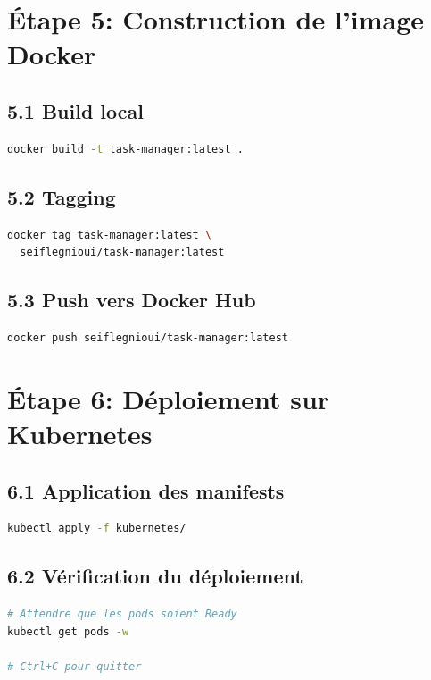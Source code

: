 \documentclass[12pt,a4paper,twoside]{report}
\begin{document}
\section{Étape 5: Construction de l'image Docker}

\subsection{5.1 Build local}

\begin{lstlisting}[language=bash]
docker build -t task-manager:latest .
\end{lstlisting}

\subsection{5.2 Tagging}

\begin{lstlisting}[language=bash]
docker tag task-manager:latest \
  seiflegnioui/task-manager:latest
\end{lstlisting}

\subsection{5.3 Push vers Docker Hub}

\begin{lstlisting}[language=bash]
docker push seiflegnioui/task-manager:latest
\end{lstlisting}

\section{Étape 6: Déploiement sur Kubernetes}

\subsection{6.1 Application des manifests}

\begin{lstlisting}[language=bash]
kubectl apply -f kubernetes/
\end{lstlisting}

\subsection{6.2 Vérification du déploiement}

\begin{lstlisting}[language=bash]
# Attendre que les pods soient Ready
kubectl get pods -w

# Ctrl+C pour quitter
\end{lstlisting}
\end{document}
